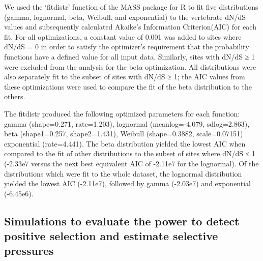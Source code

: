 
We used the ‘fitdistr’ function of the MASS package for R to fit five
distributions (gamma, lognormal, beta, Weibull, and exponential) to
the vertebrate dN/dS values and subsequently calculated Akaike’s
Information Criterion(AIC) for each fit. For all optimizations, a
constant value of 0.001 was added to sites where dN/dS = 0 in order to
satisfy the optimizer’s requirement that the probability functions
have a defined value for all input data. Similarly, sites with dN/dS ≥
1 were excluded from the analysis for the beta optimization. All
distributions were also separately fit to the subset of sites with
dN/dS ≥ 1; the AIC values from these optimizations were used to
compare the fit of the beta distribution to the others.

The fitdistr produced the following optimized parameters for each
function: gamma (shape=0.271, rate=1.203), lognormal (meanlog=-4.079,
sdlog=2.863), beta (shape1=0.257, shape2=1.431), Weibull
(shape=0.3882, scale=0.07151) exponential (rate=4.441). The beta
distribution yielded the lowest AIC when compared to the fit of other
distributions to the subset of sites where dN/dS ≤ 1 (-2.33e7 versus
the next best equivalent AIC of -2.11e7 for the lognormal). Of the
distributions which were fit to the whole dataset, the lognormal
distribution yielded the lowest AIC (-2.11e7), followed by gamma
(-2.03e7) and exponential (-6.45e6).

\subsection{Simulations to evaluate the power to detect positive selection and estimate selective pressures}



